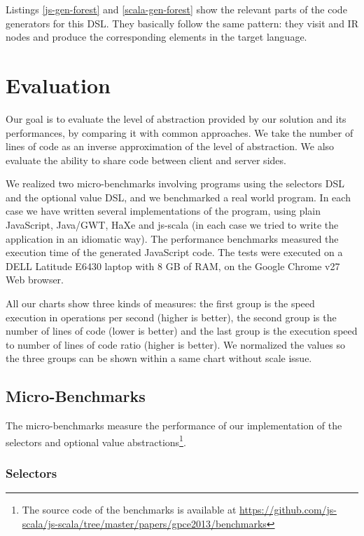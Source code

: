 \documentclass[preprint]{sigplanconf}
\begin{document}
Listings \ref{js-gen-forest} and \ref{scala-gen-forest} show the relevant parts of the code
generators for this DSL. They basically follow the same pattern: they visit  and
 IR nodes and produce the corresponding elements in the target language.


\section{Evaluation}
\label{sec:validation}

Our goal is to evaluate the level of abstraction provided by our solution and its performances, by
comparing it with common approaches. We take the number of lines of code as an inverse approximation
of the level of abstraction. We also evaluate the ability to share code between client and server
sides.

We realized two micro-benchmarks involving programs using the selectors DSL and the
optional value DSL, and we benchmarked a real world program. In each case we have written several
implementations of the program, using plain JavaScript, Java/GWT, HaXe and js-scala (in each case we
tried to write the application in an idiomatic way). The performance benchmarks measured the
execution time of the generated JavaScript code. The tests were executed on a DELL Latitude E6430
laptop with 8 GB of RAM, on the Google Chrome v27 Web browser.

All our charts show three kinds of measures: the first group is the speed execution in operations
per second (higher is better), the second group is the number of lines of code (lower is better) and
the last group is the execution speed to number of lines of code ratio (higher is better). We
normalized the values so the three groups can be shown within a same chart without scale issue.

\subsection{Micro-Benchmarks}

The micro-benchmarks measure the performance of our implementation of the selectors and optional
value abstractions\footnote{The source code of the benchmarks is available at
\href{https://github.com/js-scala/js-scala/tree/master/papers/gpce2013/benchmarks}{
https://github.com/js-scala/js-scala/tree/master/papers/gpce2013/benchmarks}}.

\subsubsection{Selectors}
\end{document}
